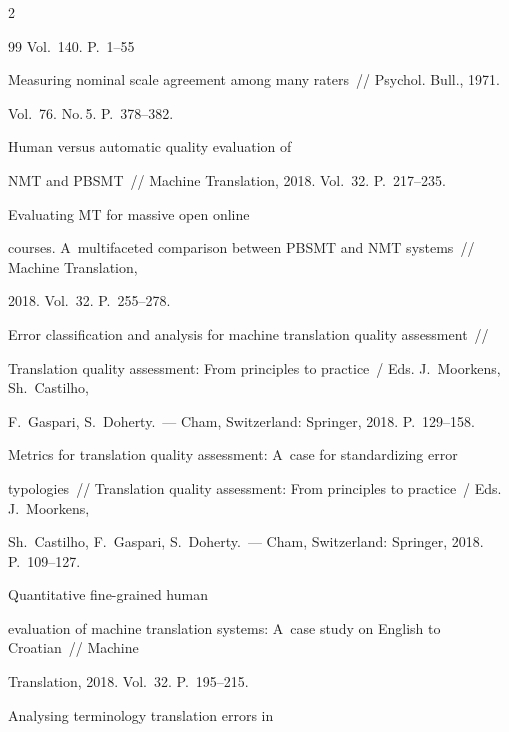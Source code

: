 \begin{multicols}{2}
{{\begin{thebibliography}{99}
Vol.~140. P.~1--55




 Measuring nominal scale agreement among many raters~// Psychol. Bull., 1971. 


Vol.~76. No.\,5. P.~378--382.




 Human versus automatic quality evaluation of 


NMT and PBSMT~// Machine Translation, 2018. Vol.~32. P.~217--235.




 Evaluating MT for massive open online 


courses. A~multifaceted comparison between PBSMT and NMT systems~// Machine Translation, 


2018. Vol.~32. P.~255--278.




 Error classification and analysis for machine translation quality assessment~// 


Translation quality assessment: From principles to practice~/ Eds. J.~Moorkens, Sh.~Castilho, 


F.~Gaspari, S.~Doherty.~--- Cham, Switzerland: Springer, 2018. P.~129--158.




 Metrics for translation quality assessment: A~case for standardizing error 


typologies~// Translation quality assessment: From principles to practice~/ Eds. J.~Moorkens, 


Sh.~Castilho, F.~Gaspari, S.~Doherty.~--- Cham, Switzerland: Springer, 2018. P.~109--127.






 Quantitative fine-grained human 


evaluation of machine translation systems: A~case study on English to Croatian~// Machine 


Translation, 2018. Vol.~32. P.~195--215.




 Analysing terminology translation errors in 



\end{thebibliography}}}
\end{multicols}
